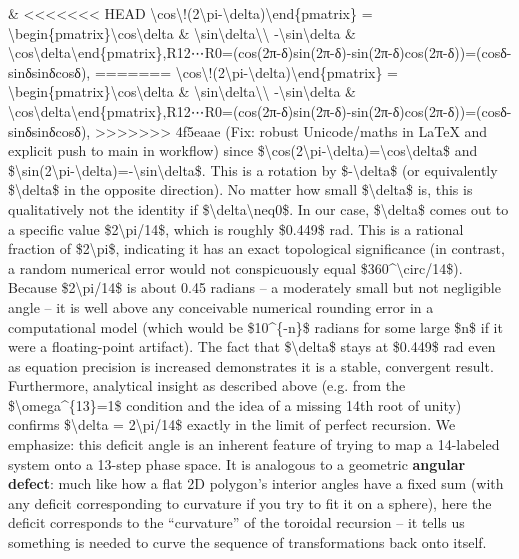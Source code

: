 \documentclass[]{article}
\begin{document}
{\&
<<<<<<< HEAD
\textbackslash cos\textbackslash!(2\textbackslash pi-\textbackslash delta)\textbackslash end\{pmatrix\}
= \textbackslash begin\{pmatrix\}\textbackslash cos\textbackslash delta
\& \textbackslash sin\textbackslash delta\textbackslash\textbackslash{}
-\textbackslash sin\textbackslash delta \&
\textbackslash cos\textbackslash delta\textbackslash end\{pmatrix\},R12\hspace{0pt}⋯R0\hspace{0pt}=(cos(2π-δ)sin(2π-δ)\hspace{0pt}-sin(2π-δ)cos(2π-δ)\hspace{0pt})=(cosδ-sinδ\hspace{0pt}sinδcosδ\hspace{0pt}),
=======
\textbackslash{}cos\textbackslash{}!(2\textbackslash{}pi-\textbackslash{}delta)\textbackslash{}end\{pmatrix\}
=
\textbackslash{}begin\{pmatrix\}\textbackslash{}cos\textbackslash{}delta
\&
\textbackslash{}sin\textbackslash{}delta\textbackslash{}\textbackslash{}
-\textbackslash{}sin\textbackslash{}delta \&
\textbackslash{}cos\textbackslash{}delta\textbackslash{}end\{pmatrix\},R12​⋯R0​=(cos(2π-δ)sin(2π-δ)​-sin(2π-δ)cos(2π-δ)​)=(cosδ-sinδ​sinδcosδ​),
>>>>>>> 4f5eaae (Fix: robust Unicode/maths in LaTeX and explicit push to main in workflow)
since
\$\textbackslash{}cos(2\textbackslash{}pi-\textbackslash{}delta)=\textbackslash{}cos\textbackslash{}delta\$
and
\$\textbackslash{}sin(2\textbackslash{}pi-\textbackslash{}delta)=-\textbackslash{}sin\textbackslash{}delta\$.
This is a rotation by \$-\textbackslash{}delta\$ (or equivalently
\$\textbackslash{}delta\$ in the opposite direction). No matter how
small \$\textbackslash{}delta\$ is, this is qualitatively not the
identity if \$\textbackslash{}delta\textbackslash{}neq0\$. In our case,
\$\textbackslash{}delta\$ comes out to a specific value
\$2\textbackslash{}pi/14\$, which is roughly \$0.449\$ rad. This is a
rational fraction of \$2\textbackslash{}pi\$, indicating it has an exact
topological significance (in contrast, a random numerical error would
not conspicuously equal \$360\^{}\textbackslash{}circ/14\$). Because
\$2\textbackslash{}pi/14\$ is about 0.45 radians -- a moderately small
but not negligible angle -- it is well above any conceivable numerical
rounding error in a computational model (which would be \$10\^{}\{-n\}\$
radians for some large \$n\$ if it were a floating-point artifact). The
fact that \$\textbackslash{}delta\$ stays at \$0.449\$ rad even as
equation precision is increased demonstrates it is a stable, convergent
result. Furthermore, analytical insight as described above (e.g. from
the \$\textbackslash{}omega\^{}\{13\}=1\$ condition and the idea of a
missing 14th root of unity) confirms \$\textbackslash{}delta =
2\textbackslash{}pi/14\$ exactly in the limit of perfect recursion. We
emphasize: this deficit angle is an inherent feature of trying to map a
14-labeled system onto a 13-step phase space. It is analogous to a
geometric \textbf{angular defect}: much like how a flat 2D polygon's
interior angles have a fixed sum (with any deficit corresponding to
curvature if you try to fit it on a sphere), here the deficit
corresponds to the ``curvature'' of the toroidal recursion -- it tells
us something is needed to curve the sequence of transformations back
onto itself.

}
\end{document}
